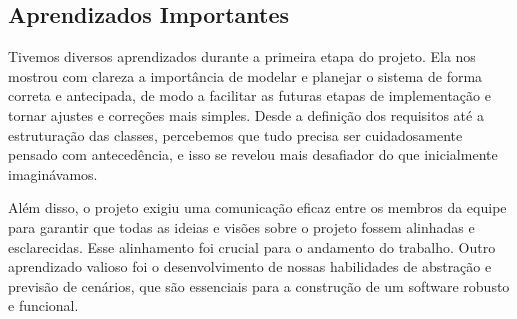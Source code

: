 \documentclass[a4paper,12pt]{report}
\begin{document}
\subsection{Aprendizados Importantes}

Tivemos diversos aprendizados durante a primeira etapa do projeto. Ela nos mostrou com clareza a importância de modelar e planejar o sistema de forma correta e antecipada, de modo a facilitar as futuras etapas de implementação e tornar ajustes e correções mais simples. Desde a definição dos requisitos até a estruturação das classes, percebemos que tudo precisa ser cuidadosamente pensado com antecedência, e isso se revelou mais desafiador do que inicialmente imaginávamos.

Além disso, o projeto exigiu uma comunicação eficaz entre os membros da equipe para garantir que todas as ideias e visões sobre o projeto fossem alinhadas e esclarecidas. Esse alinhamento foi crucial para o andamento do trabalho. Outro aprendizado valioso foi o desenvolvimento de nossas habilidades de abstração e previsão de cenários, que são essenciais para a construção de um software robusto e funcional.
\end{document}
